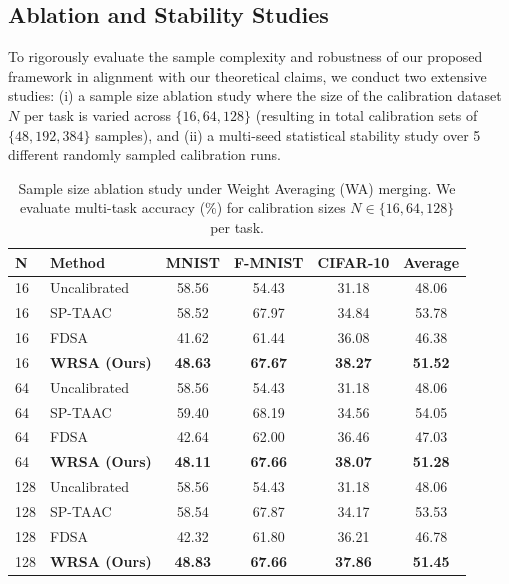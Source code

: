 \documentclass{article}
\theoremstyle{plain}
\theoremstyle{definition}
\theoremstyle{remark}
\begin{document}
\subsection{Ablation and Stability Studies}
To rigorously evaluate the sample complexity and robustness of our proposed framework in alignment with our theoretical claims, we conduct two extensive studies: (i) a sample size ablation study where the size of the calibration dataset $N$ per task is varied across $\{16, 64, 128\}$ (resulting in total calibration sets of $\{48, 192, 384\}$ samples), and (ii) a multi-seed statistical stability study over 5 different randomly sampled calibration runs.

\begin{table}[tb]
\caption{Sample size ablation study under Weight Averaging (WA) merging. We evaluate multi-task accuracy (\%) for calibration sizes $N \in \{16, 64, 128\}$ per task.}
\label{tab:ablation}
\vskip 0.1in
\centering
\begin{scriptsize}
\setlength{\tabcolsep}{2pt}
\begin{tabular}{llcccc}
\toprule
\textbf{N} & \textbf{Method} & \textbf{MNIST} & \textbf{F-MNIST} & \textbf{CIFAR-10} & \textbf{Average} \\
\midrule
16 & Uncalibrated & 58.56 & 54.43 & 31.18 & 48.06 \\
16 & SP-TAAC & 58.52 & 67.97 & 34.84 & 53.78 \\
16 & FDSA & 41.62 & 61.44 & 36.08 & 46.38 \\
16 & \textbf{WRSA (Ours)} & \textbf{48.63} & \textbf{67.67} & \textbf{38.27} & \textbf{51.52} \\
\midrule
64 & Uncalibrated & 58.56 & 54.43 & 31.18 & 48.06 \\
64 & SP-TAAC & 59.40 & 68.19 & 34.56 & 54.05 \\
64 & FDSA & 42.64 & 62.00 & 36.46 & 47.03 \\
64 & \textbf{WRSA (Ours)} & \textbf{48.11} & \textbf{67.66} & \textbf{38.07} & \textbf{51.28} \\
\midrule
128 & Uncalibrated & 58.56 & 54.43 & 31.18 & 48.06 \\
128 & SP-TAAC & 58.54 & 67.87 & 34.17 & 53.53 \\
128 & FDSA & 42.32 & 61.80 & 36.21 & 46.78 \\
128 & \textbf{WRSA (Ours)} & \textbf{48.83} & \textbf{67.66} & \textbf{37.86} & \textbf{51.45} \\
\bottomrule
\end{tabular}
\end{scriptsize}
\vskip -0.1in
\end{table}
\end{document}

